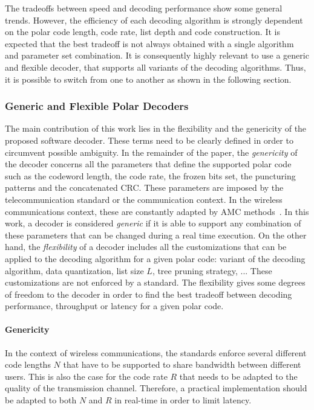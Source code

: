 The tradeoffs between speed and decoding performance show some general trends.
However, the efficiency of each decoding algorithm is strongly dependent on the
polar code length, code rate, list depth and code construction. It is expected
that the best tradeoff is not always obtained with a single algorithm and
parameter set combination. It is consequently highly relevant to use a generic
and flexible decoder, that supports all variants of the decoding algorithms.
Thus, it is possible to switch from one to another as shown in the following
section.

\subsubsection{Generic and Flexible Polar Decoders}
\label{sec:polar_genericity}

The main contribution of this work lies in the flexibility and the genericity of
the proposed software decoder. These terms need to be clearly defined in order
to circumvent possible ambiguity. In the remainder of the paper, the
\textit{genericity} of the decoder concerns all the parameters that define the
supported polar code such as the codeword length, the code rate, the frozen bits
set, the puncturing patterns and the concatenated CRC. These parameters are
imposed by the telecommunication standard or the communication context. In the
wireless communications context, these are constantly adapted by AMC
methods~\cite{Dahlman2013}. In this work, a decoder is considered
\textit{generic} if it is able to support any combination of these parameters
that can be changed during a real time execution. On the other hand, the
\textit{flexibility} of a decoder includes all the customizations that can be
applied to the decoding algorithm for a given polar code: variant of the
decoding algorithm, data quantization, list size $L$, tree pruning strategy, ...
These customizations are not enforced by a standard. The flexibility gives some
degrees of freedom to the decoder in order to find the best tradeoff between
decoding performance, throughput or latency for a given polar code.

\paragraph{Genericity}

In the context of wireless communications, the standards enforce several
different code lengths $N$ that have to be supported to share bandwidth between
different users. This is also the case for the code rate $R$ that needs to be
adapted to the quality of the transmission channel. Therefore, a practical
implementation should be adapted to both $N$ and $R$ in real-time in order to
limit latency.

